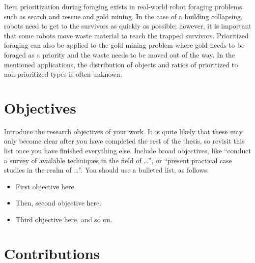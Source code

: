 Item prioritization during foraging exists in real-world robot foraging problems such as search and rescue and gold mining. In the case of a building collapsing, robots need to get to the survivors as quickly as possible; however, it is important that some robots move waste material to reach the trapped survivors. Prioritized foraging can also be applied to the gold mining problem where  gold needs to be foraged as a priority and the waste needs to be moved out of the way. In the mentioned applications, the distribution of objects and ratios of prioritized to non-prioritized types is often unknown.


\section{Objectives}
\label{sec:introduction:objectives}

Introduce the research objectives of your work. It is quite likely that these may only become clear after you have completed the rest of the thesis, so revisit this list once you have finished everything else. Include broad objectives, like ``conduct a survey of available techniques in the field of \ldots'', or ``present practical case studies in the realm of \ldots''. You should use a bulleted list, as follows:
\begin{itemize}
	\item First objective here.

	\item Then, second objective here.

	\item Third objective here, and so on.
\end{itemize}


\section{Contributions}
\label{sec:introduction:contributions}


